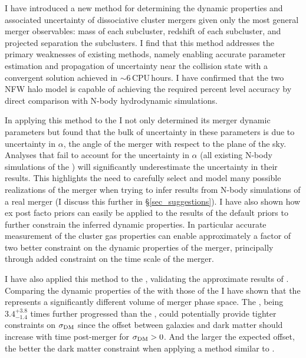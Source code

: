 \documentclass[12pt]{emulateapj}
\begin{document}
I have introduced a new method for determining the dynamic properties and associated uncertainty of dissociative cluster mergers given only the most general merger observables: mass of each subcluster, redshift of each subcluster, and projected separation the subclusters.
I find that this method addresses the primary weaknesses of existing methods, namely enabling accurate parameter estimation and propagation of uncertainty near the collision state with a convergent solution achieved in $\sim$6\,CPU\,hours. 
I have confirmed that the two NFW halo model is capable of achieving the required percent level accuracy by direct comparison with N-body hydrodynamic simulations.

In applying this method to the  I not only determined its merger dynamic parameters but found that the bulk of uncertainty in these parameters is due to uncertainty in $\alpha$, the angle of the merger with respect to the plane of the sky.
Analyses that fail to account for the uncertainty in $\alpha$ (all existing N-body simulations of the ) will significantly underestimate the uncertainty in their results.
This highlights the need to carefully select and model many possible realizations of the merger when trying to infer results from N-body simulations of a real merger (I discuss this further in \S\ref{sec_suggestions}).
I have also shown how ex post facto priors can easily be applied to the results of the default priors to further constrain the inferred dynamic properties.
In particular accurate measurement of the cluster gas properties can enable approximately a factor of two better constraint on the dynamic properties of the merger, principally through added constraint on the time scale of the merger.

I have also applied this method to the , validating the approximate results of \citet{Dawson:2012dl}.
Comparing the dynamic properties of the  with those of the  I have shown that the  represents a significantly different volume of merger phase space.
The , being $3.4^{+3.8}_{-1.4}$ times further progressed than the , could potentially provide tighter constraints on $\sigma_{\rm DM}$ since the offset between galaxies and dark matter should increase with time post-merger for  $\sigma_{\rm DM}>0$.
And the larger the expected offset, the better the dark matter constraint when applying a method similar to \citet{Randall:2008hs}.
\end{document}
